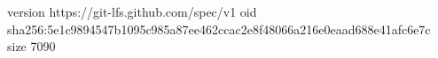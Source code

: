 version https://git-lfs.github.com/spec/v1
oid sha256:5e1c9894547b1095c985a87ee462ccac2e8f48066a216e0eaad688e41afc6e7c
size 7090
